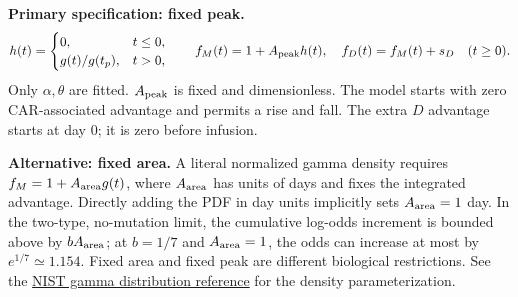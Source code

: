 \documentclass[11pt]{article}
\begin{document}
\textbf{Primary specification: fixed peak.}
\[
h(t)=\begin{cases}0,&t\le0,\\g(t)/g(t_p),&t>0,\end{cases}
\qquad
f_M(t)=1+A_{\rm peak}h(t),\quad
f_D(t)=f_M(t)+s_D\quad(t\ge0).
\]
Only $\alpha,\theta$ are fitted. $A_{\rm peak}$ is fixed and dimensionless. The model starts with zero CAR-associated advantage and permits a rise and fall. The extra $D$ advantage starts at day 0; it is zero before infusion.

\textbf{Alternative: fixed area.} A literal normalized gamma density requires
$f_M=1+A_{\rm area}g(t)$, where $A_{\rm area}$ has units of days and fixes the integrated advantage. Directly adding the PDF in day units implicitly sets $A_{\rm area}=1$ day. In the two-type, no-mutation limit, the cumulative log-odds increment is bounded above by $bA_{\rm area}$; at $b=1/7$ and $A_{\rm area}=1$, the odds can increase at most by $e^{1/7}\simeq1.154$. Fixed area and fixed peak are different biological restrictions. See the \href{https://www.itl.nist.gov/div898/handbook/eda/section3/eda366b.htm}{NIST gamma distribution reference} for the density parameterization.
\end{document}
